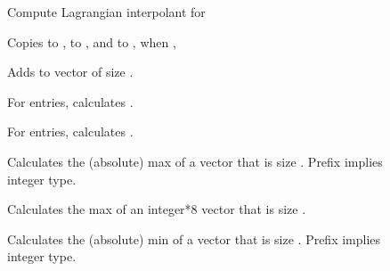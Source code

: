 \documentclass[letterpaper,10pt,english]{sphinxmanual}
\begin{document}
\begin{description}
\item[{}] \leavevmode
Compute Lagrangian interpolant for 

\item[{}] \leavevmode
Copies  to ,  to , and  to , when ,

\item[{}] \leavevmode
Adds  to vector  of size .

\item[{}] \leavevmode
For  entries, calculates .

\item[{}] \leavevmode
For  entries, calculates .

\end{description}


\begin{description}
\item[{}] \leavevmode
Calculates the (absolute) max of a vector that is size . Prefix  implies integer type.

\item[{}] \leavevmode
Calculates the max of an integer*8 vector that is size .

\end{description}


\begin{description}
\item[{}] \leavevmode
Calculates the (absolute) min of a vector that is size . Prefix  implies integer type.

\end{description}
\end{document}
